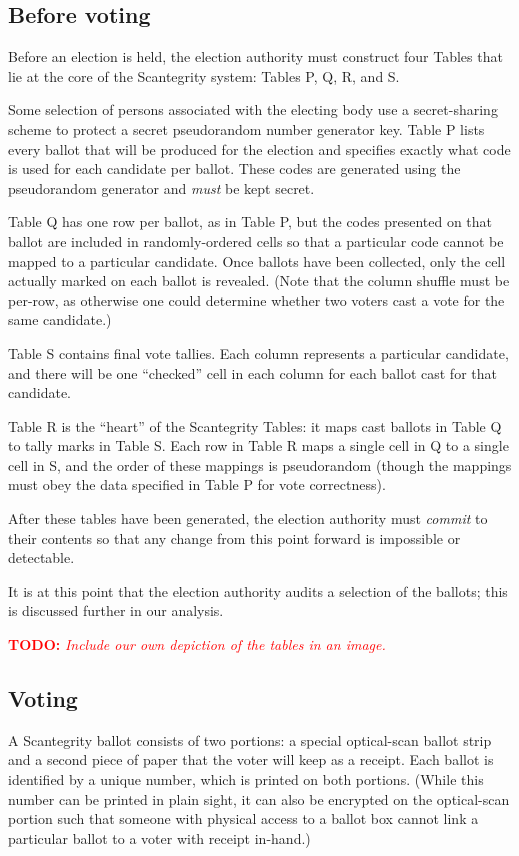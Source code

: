 \documentclass[10pt]{article}
\newcommand{\todo}[1]{\textcolor{red}{\textbf{TODO:} \emph{#1}}}
\newcommand{\term}[1]{\textit{#1}}
\begin{document}
\begin{multicols}{2}
\subsection{Before voting}

Before an election is held, the election authority must construct four Tables that lie at the core
of the Scantegrity system: Tables P, Q, R, and S.

Some selection of persons associated with the electing body use a secret-sharing scheme to protect a
secret pseudorandom number generator key. Table P lists every ballot that will be produced for the
election and specifies exactly what code is used for each candidate per ballot. These codes are
generated using the pseudorandom generator and \emph{must} be kept secret.

Table Q has one row per ballot, as in Table P, but the codes presented on that ballot are included
in randomly-ordered cells so that a particular code cannot be mapped to a particular candidate.
Once ballots have been collected, only the cell actually marked on each ballot is revealed. (Note
that the column shuffle must be per-row, as otherwise one could determine whether two voters
cast a vote for the same candidate.)

Table S contains final vote tallies. Each column represents a particular candidate, and there will
be one ``checked'' cell in each column for each ballot cast for that candidate.

Table R is the ``heart'' of the Scantegrity Tables: it maps cast ballots in Table Q to tally marks
in Table S. Each row in Table R maps a single cell in Q to a single cell in S, and the order of
these mappings is pseudorandom (though the mappings must obey the data specified in Table P for vote
correctness).

After these tables have been generated, the election authority must \term{commit} to their contents
so that any change from this point forward is impossible or detectable.

It is at this point that the election authority audits a selection of the ballots; this is discussed
further in our analysis.

\todo{Include our own depiction of the tables in an image.}

\subsection{Voting}

A Scantegrity ballot consists of two portions: a special optical-scan ballot strip and a second
piece of paper that the voter will keep as a receipt. Each ballot is identified by a unique number,
which is printed on both portions. (While this number can be printed in plain sight, it can also be
encrypted on the optical-scan portion such that someone with physical access to a ballot box cannot
link a particular ballot to a voter with receipt in-hand.)


\end{multicols}
\end{document}
